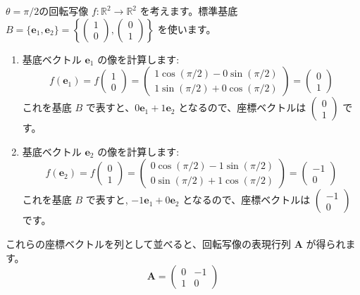 \begin{ex}[2次元平面上の回転写像の表現行列]
$\theta = \pi/2$の回転写像 $f: \mathbb{R}^2 \to \mathbb{R}^2$ を考えます。標準基底 $B = \{\bm{e}_1, \bm{e}_2\} = \left\{ \begin{pmatrix} 1 \\ 0 \end{pmatrix}, \begin{pmatrix} 0 \\ 1 \end{pmatrix} \right\}$ を使います。
\begin{enumerate}
\item 基底ベクトル $\bm{e}_1$ の像を計算します:
    \[f(\bm{e}_1) = f\begin{pmatrix} 1 \\ 0 \end{pmatrix} = \begin{pmatrix} 1\cos(\pi/2) - 0\sin(\pi/2) \\ 1\sin(\pi/2) + 0\cos(\pi/2) \end{pmatrix} = \begin{pmatrix} 0 \\ 1 \end{pmatrix}\]
    これを基底 $B$ で表すと、$0\bm{e}_1 + 1\bm{e}_2$ となるので、座標ベクトルは $\begin{pmatrix} 0 \\ 1 \end{pmatrix}$ です。
\item 基底ベクトル $\bm{e}_2$ の像を計算します:
    \[f(\bm{e}_2) = f\begin{pmatrix} 0 \\ 1 \end{pmatrix} = \begin{pmatrix} 0\cos(\pi/2) - 1\sin(\pi/2) \\ 0\sin(\pi/2) + 1\cos(\pi/2) \end{pmatrix} = \begin{pmatrix} -1 \\ 0 \end{pmatrix}\]
    これを基底 $B$ で表すと, $-1\bm{e}_1 + 0\bm{e}_2$ となるので、座標ベクトルは $\begin{pmatrix} -1 \\ 0 \end{pmatrix}$ です。
\end{enumerate}
これらの座標ベクトルを列として並べると、回転写像の表現行列 $\bm{A}$ が得られます。
\[\bm{A} = \begin{pmatrix} 0 & -1 \\ 1 & 0 \end{pmatrix}\]

\end{ex}
